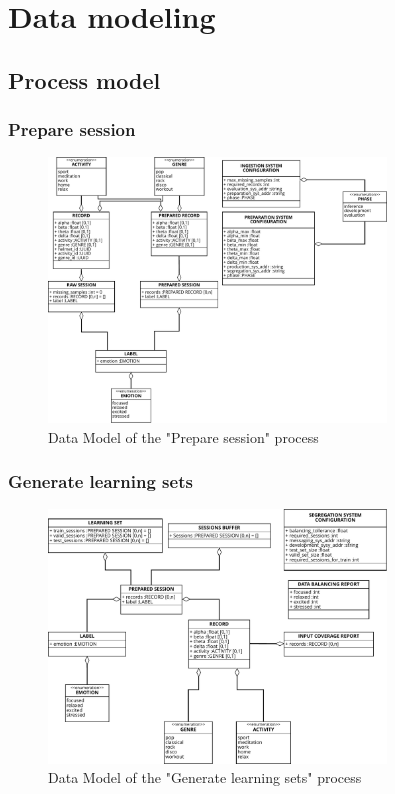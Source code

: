 \section{Data modeling}
\label{sec:data_modeling}   

\subsection{Process model}

\subsubsection{Prepare session}
\label{sec:data_prepare_session}

\begin{figure}[H]
\centering
\includegraphics[width=0.8\textwidth]{figures/Data Model - Prepare Session.pdf}
\caption{Data Model of the "Prepare session" process}
\label{fig:data_prepare_session}
\end{figure}

\subsubsection{Generate learning sets}
\label{sec:data_generate_learning_sets}

\begin{figure}[H]
\centering
\includegraphics[width=0.8\textwidth]{figures/Data Model - Generate Learning Sets.pdf}
\caption{Data Model of the "Generate learning sets" process}
\label{fig:data_generate_learning_sets}
\end{figure}


